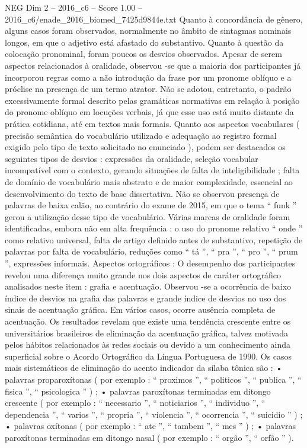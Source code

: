 \begin{textsample}{NEG Dim 2 – 2016\_c6 – Score 1.00 – 2016\_c6/enade\_2016\_biomed\_7425d9844e.txt}
Quanto à concordância de gênero, alguns casos foram observados, normalmente no âmbito de sintagmas nominais longos, em que o adjetivo está afastado do substantivo.
Quanto à questão da colocação pronominal, foram poucos os desvios observados.
Apesar de serem aspectos relacionados à oralidade, observou -se que a maioria dos participantes já incorporou regras como a não introdução da frase por um pronome oblíquo e a próclise na presença de um termo atrator.
Não se adotou, entretanto, o padrão excessivamente formal descrito pelas gramáticas normativas em relação à posição do pronome oblíquo em locuções verbais, já que esse uso está muito distante da prática cotidiana, até em textos mais formais.
Quanto aos aspectos vocabulares ( precisão semântica do vocabulário utilizado e adequação ao registro formal exigido pelo tipo de texto solicitado no enunciado ), podem ser destacados os seguintes tipos de desvios : expressões da oralidade, seleção vocabular incompatível com o contexto, gerando situações de falta de inteligibilidade ; falta de domínio de vocabulário mais abstrato e de maior complexidade, essencial ao desenvolvimento do texto de base dissertativa.
Não se observou presença de palavras de baixa calão, ao contrário do exame de 2015, em que o tema “ funk ” gerou a utilização desse tipo de vocabulário.
Várias marcas de oralidade foram identificadas, embora não em alta frequência : o uso do pronome relativo “ onde ” como relativo universal, falta de artigo definido antes de substantivo, repetição de palavras por falta de vocabulário, reduções como “ tá ”, “ pra ”, “ pro ”, “ prum ”, expressões informais.
Aspectos ortográficos : O desempenho dos participantes revelou uma diferença muito grande nos dois aspectos de caráter ortográfico analisados neste item : grafia e acentuação.
Observou -se a ocorrência de baixo índice de desvios na grafia das palavras e grande índice de desvios no uso dos sinais de acentuação gráfica.
Em vários casos, ocorre ausência completa de acentuação.
Os resultados revelam que existe uma tendência crescente entre os universitários brasileiros de eliminação da acentuação gráfica, talvez motivada pelos hábitos relacionados às redes sociais ou devido a um conhecimento ainda superficial sobre o Acordo Ortográfico da Língua Portuguesa de 1990.
Os casos mais sistemáticos de eliminação do acento indicador da sílaba tônica são : • palavras proparoxítonas ( por exemplo : “ proximos ”, “ politicos ”, “ publica ”, “ fisica ”, “ psicologica ” ) ; • palavras paroxítonas terminadas em ditongo crescente ( por exemplo : “ necessario ”, “ noticiarios ”, “ individuo ”, “ dependencia ”, “ varios ”, “ propria ”, “ violencia ”, “ ocorrencia ”, “ suicidio ” ) ; • palavras oxítonas ( por exemplo : “ ate ”, “ tambem ”, “ mes ” ) ; • palavras paroxítonas terminadas em ditongo nasal ( por exemplo : “ orgão ”, “ orfão ” ).

\end{textsample}
